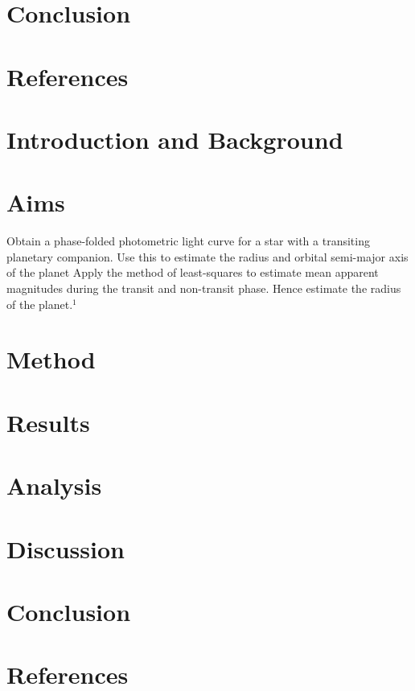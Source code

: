 \documentclass[]{article}
\begin{document}
\section*{Conclusion}

\section*{References}

\newpage
\section*{Introduction and Background}

\section*{Aims}

Obtain a phase-folded photometric light curve for a star with a transiting planetary companion. Use this to estimate the radius and orbital semi-major axis of the planet
Apply the method of least-squares to estimate mean apparent magnitudes during the transit and non-transit phase. Hence estimate the radius of the planet.$^1$


\section*{Method}

\section*{Results}

\section*{Analysis}
\section*{Discussion}

\section*{Conclusion}

\section*{References}
\end{document}
